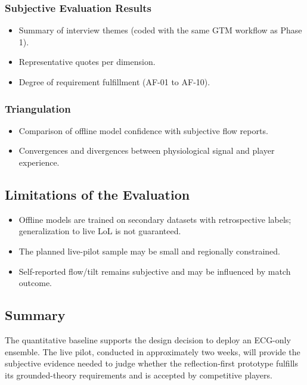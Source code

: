 \subsubsection{Subjective Evaluation Results}

\begin{itemize}
    \item Summary of interview themes (coded with the same GTM workflow as Phase 1).
    \item Representative quotes per dimension.
    \item Degree of requirement fulfillment (AF-01 to AF-10).
\end{itemize}

\subsubsection{Triangulation}

\begin{itemize}
    \item Comparison of offline model confidence with subjective flow reports.
    \item Convergences and divergences between physiological signal and player experience.
\end{itemize}

\subsection{Limitations of the Evaluation}

\begin{itemize}
    \item Offline models are trained on secondary datasets with retrospective labels; generalization to live LoL is not guaranteed.
    \item The planned live-pilot sample may be small and regionally constrained.
    \item Self-reported flow/tilt remains subjective and may be influenced by match outcome.
\end{itemize}

\subsection{Summary}

The quantitative baseline supports the design decision to deploy an ECG-only ensemble. The live pilot, conducted in approximately two weeks, will provide the subjective evidence needed to judge whether the reflection-first prototype fulfills its grounded-theory requirements and is accepted by competitive players.
